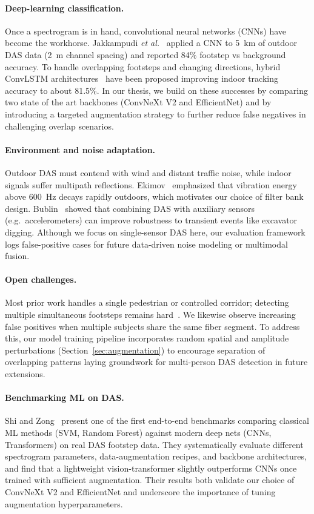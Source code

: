 \paragraph{Deep-learning classification.}
Once a spectrogram is in hand, convolutional neural networks (CNNs) have become the workhorse. Jakkampudi \textit{et al.}~\cite{footstep} applied a CNN to 5~km of outdoor DAS data (2~m channel spacing) and reported 84\% footstep vs background accuracy. To handle overlapping footsteps and changing directions, hybrid ConvLSTM architectures~\cite{zhou2024large} have been proposed improving indoor tracking accuracy to about 81.5\%. In our thesis, we build on these successes by comparing two state of the art backbones (ConvNeXt V2 and EfficientNet) and by introducing a targeted augmentation strategy to further reduce false negatives in challenging overlap scenarios.

\paragraph{Environment and noise adaptation.}
Outdoor DAS must contend with wind and distant traffic noise, while indoor signals suffer multipath reflections. Ekimov~\cite{ekimov2007ultrasonic} emphasized that vibration energy above 600~Hz decays rapidly outdoors, which motivates our choice of filter bank design. Bublin~\cite{bublin2021event} showed that combining DAS with auxiliary sensors (e.g.\ accelerometers) can improve robustness to transient events like excavator digging. Although we focus on single-sensor DAS here, our evaluation framework logs false-positive cases for future data-driven noise modeling or multimodal fusion.

\paragraph{Open challenges.}
Most prior work handles a single pedestrian or controlled corridor; detecting multiple simultaneous footsteps remains hard~\cite{footstep}. We likewise observe increasing false positives when multiple subjects share the same fiber segment. To address this, our model training pipeline incorporates random spatial and amplitude perturbations (Section~\ref{sec:augmentation}) to encourage separation of overlapping patterns laying groundwork for multi-person DAS detection in future extensions.

\paragraph{Benchmarking ML on DAS.}
Shi and Zong~\cite{Shi2025Benchmark} present one of the first end-to-end benchmarks comparing classical ML methods (SVM, Random Forest) against modern deep nets (CNNs, Transformers) on real DAS footstep data. They systematically evaluate different spectrogram parameters, data-augmentation recipes, and backbone architectures, and find that a lightweight vision-transformer slightly outperforms CNNs once trained with sufficient augmentation. Their results both validate our choice of ConvNeXt V2 and EfficientNet and underscore the importance of tuning augmentation hyperparameters.


